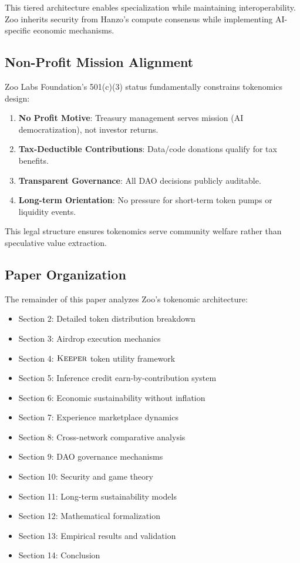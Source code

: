 This tiered architecture enables specialization while maintaining interoperability. Zoo inherits security from Hanzo's compute consensus while implementing AI-specific economic mechanisms.

\subsection{Non-Profit Mission Alignment}

Zoo Labs Foundation's 501(c)(3) status fundamentally constrains tokenomics design:

\begin{enumerate}
\item \textbf{No Profit Motive}: Treasury management serves mission (AI democratization), not investor returns.
\item \textbf{Tax-Deductible Contributions}: Data/code donations qualify for tax benefits.
\item \textbf{Transparent Governance}: All DAO decisions publicly auditable.
\item \textbf{Long-term Orientation}: No pressure for short-term token pumps or liquidity events.
\end{enumerate}

This legal structure ensures tokenomics serve community welfare rather than speculative value extraction.

\subsection{Paper Organization}

The remainder of this paper analyzes Zoo's tokenomic architecture:

\begin{itemize}
\item Section 2: Detailed token distribution breakdown
\item Section 3: Airdrop execution mechanics
\item Section 4: $\textsc{Keeper}$ token utility framework
\item Section 5: Inference credit earn-by-contribution system
\item Section 6: Economic sustainability without inflation
\item Section 7: Experience marketplace dynamics
\item Section 8: Cross-network comparative analysis
\item Section 9: DAO governance mechanisms
\item Section 10: Security and game theory
\item Section 11: Long-term sustainability models
\item Section 12: Mathematical formalization
\item Section 13: Empirical results and validation
\item Section 14: Conclusion
\end{itemize}

